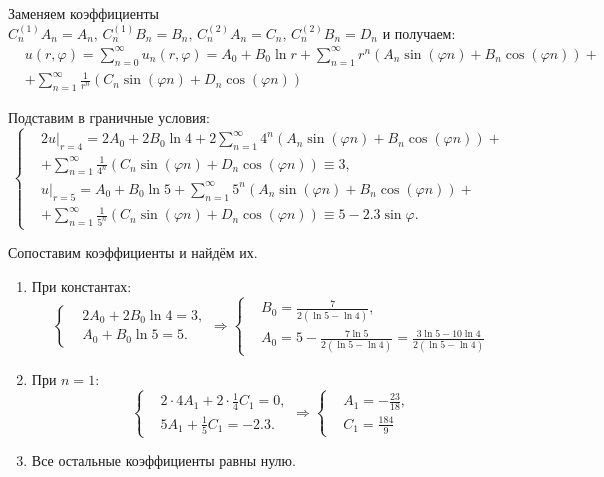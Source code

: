     Заменяем коэффициенты \( C_n^{(1)} A_n = A_n, \, C_n^{(1)} B_n = B_n, \, C_n^{(2)} A_n = C_n, \, C_n^{(2)} B_n = D_n \) и получаем:
    \[
        \begin{split}
            & u(r, \varphi) = \sum_{n=0}^{\infty} u_n(r, \varphi) = A_0 + B_0 \ln r + \sum_{n=1}^{\infty} r^n \left( A_n \sin (\varphi n) + B_n \cos (\varphi n) \right) + \\
            & + \sum_{n=1}^{\infty} \frac{1}{r^n} \left( C_n \sin (\varphi n) + D_n \cos (\varphi n) \right)
        \end{split}
    \]

    Подставим в граничные условия:
    \[
        \left\{\begin{split}
            & 2 u|_{r=4} = 2A_0 + 2B_0 \ln 4 + 2\sum_{n=1}^{\infty} 4^n \left( A_n \sin (\varphi n) + B_n \cos (\varphi n) \right) + \\
            & + \sum_{n=1}^{\infty} \frac{1}{4^n} \left( C_n \sin (\varphi n) + D_n \cos (\varphi n) \right) \equiv 3, \\[10pt]
            & u|_{r=5} = A_0 + B_0 \ln 5 + \sum_{n=1}^{\infty} 5^n \left( A_n \sin (\varphi n) + B_n \cos (\varphi n) \right) + \\
            & + \sum_{n=1}^{\infty} \frac{1}{5^n} \left( C_n \sin (\varphi n) + D_n \cos (\varphi n) \right) \equiv 5 - 2.3 \sin \varphi.
        \end{split}\right.
    \]

    Сопоставим коэффициенты и найдём их.
    \begin{enumerate}
        \item При константах:
            \[
                \left\{ \begin{split}
                    & 2A_0 + 2B_0 \ln4 = 3, \\
                    & A_0 + B_0 \ln5 = 5.
                \end{split}\right.
                \Rightarrow
                \left\{ \begin{split}
                    & B_0 = \frac{7}{2(\ln5 - \ln 4)}, \\
                    & A_0 = 5 - \frac{7 \ln 5}{2(\ln 5 - \ln 4)} = \frac{3 \ln5 - 10 \ln 4}{2(\ln5 - \ln4)}
                \end{split}\right.
            \]
        \item При \( n = 1 \):
            \[
                \left\{ \begin{split}
                    & 2 \cdot 4 A_1 + 2\cdot\frac{1}{4} C_1 = 0, \\
                    & 5 A_1 + \frac{1}{5} C_1 = -2.3.
                \end{split}\right.
                \Rightarrow
                \left\{ \begin{split}
                    & A_1 = -\frac{23}{18}, \\
                    & C_1 = \frac{184}{9}
                \end{split}\right.
            \]
        \item Все остальные коэффициенты равны нулю.
    \end{enumerate}

